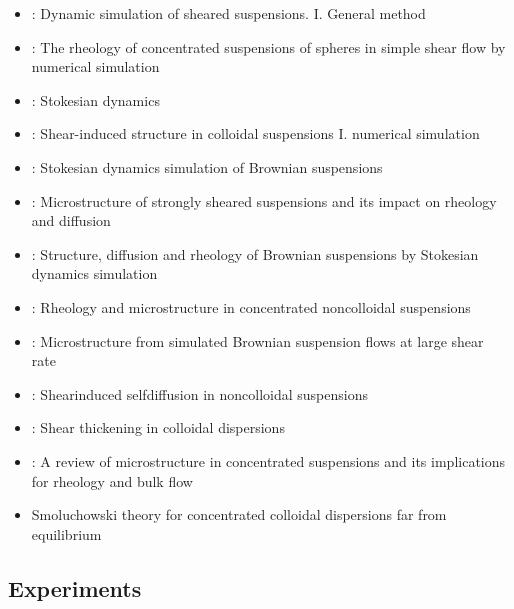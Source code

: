 \documentclass[12pt]{article}
\begin{document}
\begin{itemize}
  \item 
  \citet{Bossis_1984}:
  Dynamic simulation of sheared suspensions. I. General method
  \item
  \citet{Brady_1985}:
  The rheology of concentrated suspensions of spheres in simple shear flow by numerical simulation
  \item 
  \citet{Brady_1988}:
  Stokesian dynamics

  \item
  \citet{Bossis_1988}:
  Shear-induced structure in colloidal suspensions I. numerical simulation

  \item \citet{Phung_1996}:
  Stokesian dynamics simulation of Brownian suspensions
  \item \citet{Brady_1997}: 
  Microstructure of strongly sheared suspensions and its impact on rheology and diffusion

  \item \citet{Foss_2000}:
  Structure, diffusion and rheology of {B}rownian suspensions by {S}tokesian dynamics simulation
  \item \citet{Sierou_2002}:
  Rheology and microstructure in concentrated noncolloidal suspensions
  \item \citet{Morris_2002}:
  Microstructure from simulated Brownian suspension flows at large shear rate
  \item \citet{Sierou_2004}:
  Shearinduced selfdiffusion in noncolloidal suspensions
  \item \citet{Wagner_2009}:
  Shear thickening in colloidal dispersions
  \item \citet{Morris_2009}:
  A review of microstructure in concentrated suspensions 
  and its implications for rheology and bulk flow
 \item \citet{Nazockdast_2012}
Smoluchowski theory for concentrated colloidal dispersions far from equilibrium
\end{itemize}

\subsection*{Experiments}
\end{document}
